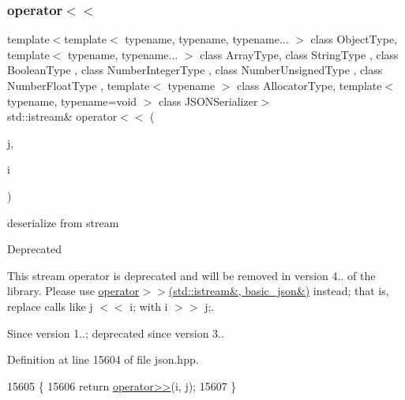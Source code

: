 \subsubsection{\texorpdfstring{operator$<$$<$}{operator<<}\hspace{0.1cm}{\footnotesize\ttfamily [2/2]}}
{\footnotesize\ttfamily template$<$template$<$ typename, typename, typename... $>$ class Object\+Type, template$<$ typename, typename... $>$ class Array\+Type, class String\+Type , class Boolean\+Type , class Number\+Integer\+Type , class Number\+Unsigned\+Type , class Number\+Float\+Type , template$<$ typename $>$ class Allocator\+Type, template$<$ typename, typename=void $>$ class J\+S\+O\+N\+Serializer$>$ \\
std\+::istream\& operator$<$$<$ (\begin{DoxyParamCaption}\item[{\hyperlink{classnlohmann_1_1basic__json}{basic\+\_\+json}$<$ Object\+Type, Array\+Type, String\+Type, Boolean\+Type, Number\+Integer\+Type, Number\+Unsigned\+Type, Number\+Float\+Type, Allocator\+Type, J\+S\+O\+N\+Serializer $>$ \&}]{j,  }\item[{std\+::istream \&}]{i }\end{DoxyParamCaption})\hspace{0.3cm}{\ttfamily [friend]}}



deserialize from stream 

\begin{DoxyRefDesc}{Deprecated}
\item[\hyperlink{deprecated__deprecated000003}{Deprecated}]This stream operator is deprecated and will be removed in version 4.. of the library. Please use \hyperlink{classnlohmann_1_1basic__json_aaf363408931d76472ded14017e59c9e8}{operator$>$$>$(std\+::istream\&, basic\+\_\+json\&)} instead; that is, replace calls like {\ttfamily j $<$$<$ i;} with {\ttfamily i $>$$>$ j;}. \end{DoxyRefDesc}
\begin{DoxySince}{Since}
version 1..; deprecated since version 3.. 
\end{DoxySince}


Definition at line 15604 of file json.\+hpp.


\begin{DoxyCode}
15605     \{
15606         \textcolor{keywordflow}{return} \hyperlink{classnlohmann_1_1basic__json_a34d6a60dd99e9f33b8273a1c8db5669b}{operator>>}(i, j);
15607     \}
\end{DoxyCode}
\mbox{\label{classnlohmann_1_1basic__json_a5c8bb5200f5eac10d31e26be46e5b1ac}} 
